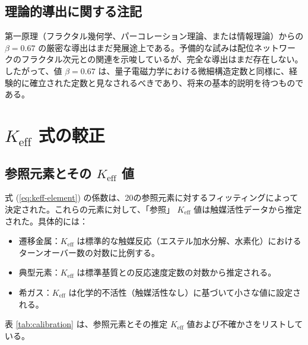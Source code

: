 \documentclass[11pt,a4paper]{article}
\newcommand{\Keff}{K_{\mathrm{eff}}}
\begin{document}
	\subsection{理論的導出に関する注記}
	
	第一原理（フラクタル幾何学、パーコレーション理論、または情報理論）からの $\beta = 0.67$ の厳密な導出はまだ発展途上である。予備的な試みは配位ネットワークのフラクタル次元との関連を示唆しているが、完全な導出はまだ存在しない。したがって、値 $\beta = 0.67$ は、量子電磁力学における微細構造定数と同様に、経験的に確立された定数と見なされるべきであり、将来の基本的説明を待つものである。
	
	\section{$\Keff$ 式の較正}
	\label{sec:calibration}
	
	\subsection{参照元素とその $\Keff$ 値}
	
	式 (\ref{eq:keff-element}) の係数は、20の参照元素に対するフィッティングによって決定された。これらの元素に対して、「参照」 $\Keff$ 値は触媒活性データから推定された。具体的には：
	
	\begin{itemize}
		\item 遷移金属：$\Keff$ は標準的な触媒反応（エステル加水分解、水素化）におけるターンオーバー数の対数に比例する。
		\item 典型元素：$\Keff$ は標準基質との反応速度定数の対数から推定される。
		\item 希ガス：$\Keff$ は化学的不活性（触媒活性なし）に基づいて小さな値に設定される。
	\end{itemize}
	
	表 \ref{tab:calibration} は、参照元素とその推定 $\Keff$ 値および不確かさをリストしている。
	
\end{document}

